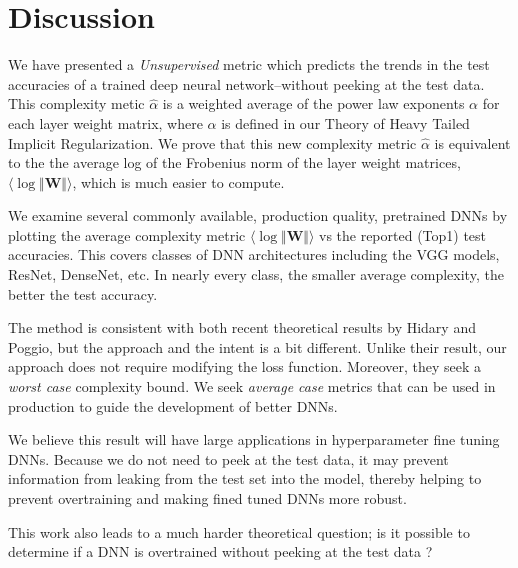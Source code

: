 \vspace{-4mm}
\section{Discussion}
\label{sxn:discussion}
\vspace{-3mm}

We have presented a \emph{Unsupervised} metric which  predicts the trends in the test accuracies of a trained deep neural network--without peeking at the test data. This complexity metic $\hat{\alpha}$ is a weighted average of the power law exponents $\alpha$ for each layer weight matrix, where 
$\alpha$ is defined in our Theory of Heavy Tailed Implicit Regularization.   We prove that this new complexity metric $\hat{\alpha}$ is equivalent to the the average log of the Frobenius norm of the layer weight matrices, $\langle\log\Vert\mathbf{W}\Vert\rangle$, which is much easier to compute.

We examine several  commonly available, production quality, pretrained DNNs  by plotting  the average complexity metric $\langle\log\Vert\mathbf{W}\Vert\rangle$ vs the reported (Top1) test accuracies. This covers classes of DNN architectures including the VGG models, ResNet, DenseNet, etc.  In nearly every class, the smaller average complexity, the better the test accuracy.

The method is consistent with both recent theoretical results by Hidary and Poggio, but the approach and the intent is a bit different. 
Unlike their result, our approach does not require modifying the loss function.
Moreover, they seek a \emph{worst case} complexity bound.  We seek \emph{average case} metrics that can be used in production
to guide the development of better DNNs.

We believe this result will have large applications in hyperparameter fine tuning DNNs.  Because we do not need to peek at the test data, it may prevent information from leaking from the test set into the model, thereby helping to prevent overtraining and making fined tuned DNNs more robust.

This work also leads to a much harder theoretical question; is it possible to determine if a DNN is overtrained without peeking at the test data ?  